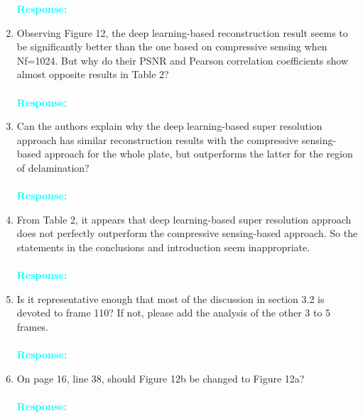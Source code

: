 \documentclass[11pt,a2paper]{report}
\begin{document}
\begin{enumerate}
		\textcolor{Cyan}
		{
			\textbf{Response:}
		}
		\item  Observing Figure 12, the deep learning-based reconstruction result seems to be significantly better than the one based on compressive sensing when Nf=1024. 
		But why do their PSNR and Pearson correlation coefficients show almost opposite results in Table 2?
		\\ \\ 
		\textcolor{Cyan}
		{
			\textbf{Response:}
		}
		\item  Can the authors explain why the deep learning-based super resolution approach has similar reconstruction results with the compressive sensing-based approach for the whole plate, but outperforms the latter for the region of delamination?
		\\ \\ 
		\textcolor{Cyan}
		{
			\textbf{Response:}
		}
		\item From Table 2, it appears that deep learning-based super resolution approach does not perfectly outperform the compressive sensing-based approach. 
		So the statements in the conclusions and introduction seem inappropriate.
		\\ \\ 
		\textcolor{Cyan}
		{
			\textbf{Response:}
		}
		\item Is it representative enough that most of the discussion in section 3.2 is devoted to frame 110? If not, please add the analysis of the other 3 to 5 frames.
		\\ \\ 
		\textcolor{Cyan}
		{
			\textbf{Response:}
		}
		\item On page 16, line 38, should Figure 12b be changed to Figure 12a?
		\\ \\ 
		\textcolor{Cyan}
		{
			\textbf{Response:}
		}
	\end{enumerate}
\end{document}

